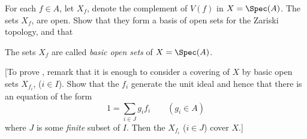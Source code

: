 \begin{exercise}
For each \(f \in A\), let \(X_f\), denote the complement of \(V(f)\) in \(X = \Spec(A)\).
The sets \(X_f\), are open.
Show that they form a basis of open sets for the Zariski topology, and that
The sets \(X_f\) are called \emph{basic open sets} of \(X = \Spec(A)\).

[To prove , remark that it is enough to consider a covering of \(X\) by basic open sets \(X_{f_i}\), (\(i \in I\)).
Show that the \(f_i\) generate the unit ideal and hence that there is an equation of the form
\begin{equation*}
1 = \sum_{i \in J} g_i f_i
\qquad (g_i \in A)
\end{equation*}
where \(J\) is some \emph{finite} subset of \(I\).
Then the \(X_{f_i}\) (\(i \in J\)) cover \(X\).]
\end{exercise}


